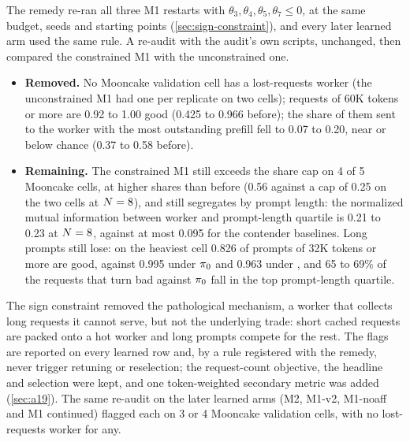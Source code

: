 The remedy re-ran all three M1 restarts with $\theta_3, \theta_4, \theta_5, \theta_7 \le 0$, at the
same budget, seeds and starting points (\cref{sec:sign-constraint}), and every later learned arm used
the same rule. A re-audit with the audit's own scripts, unchanged, then compared the constrained M1
with the unconstrained one.
\begin{itemize}
  \item \textbf{Removed.} No Mooncake validation cell has a lost-requests worker (the unconstrained
    M1 had one per replicate on two cells); requests of 60K tokens or more are 0.92 to 1.00 good
    (0.425 to 0.966 before); the share of them sent to the worker with the most outstanding prefill
    fell to 0.07 to 0.20, near or below chance (0.37 to 0.58 before).
  \item \textbf{Remaining.} The constrained M1 still exceeds the share cap on 4 of 5 Mooncake cells,
    at higher shares than before (0.56 against a cap of 0.25 on the two cells at $N = 8$), and still
    segregates by prompt length: the normalized mutual information between worker and prompt-length
    quartile is 0.21 to 0.23 at $N = 8$, against at most 0.095 for the contender baselines. Long
    prompts still lose: on the heaviest cell 0.826 of prompts of 32K tokens or more are good, against
    0.995 under $\pi_{0}$ and 0.963 under , and 65 to 69\% of the requests that turn
    bad against $\pi_{0}$ fall in the top prompt-length quartile.
\end{itemize}
The sign constraint removed the pathological mechanism, a worker that collects long requests it
cannot serve, but not the underlying trade: short cached requests are packed onto a hot worker and
long prompts compete for the rest. The flags are reported on every learned row and, by a rule
registered with the remedy, never trigger retuning or reselection; the request-count objective, the
headline and selection were kept, and one token-weighted secondary metric was added
(\cref{sec:a19}).
The same re-audit on the later learned arms (M2, M1-v2, M1-noaff and M1
continued) flagged each on 3 or 4 Mooncake validation cells, with no lost-requests worker for any.

